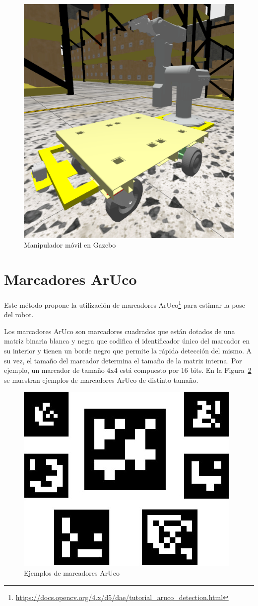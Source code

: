 \documentclass[12pt, a4paper]{report}
\begin{document}
			\begin{figure}[H]
				\centering
				\includegraphics[width=0.7\linewidth]{img/CARROLAC}
				\caption[Carrolac]{Manipulador móvil en Gazebo}
				\label{fig:carrolac}
			\end{figure}

		\section{Marcadores ArUco}\label{sec:marcadores-aruco}
			Este método propone la utilización de marcadores ArUco\footnote{\url{https://docs.opencv.org/4.x/d5/dae/tutorial\_aruco\_detection.html}} para estimar la pose del robot.

			Los marcadores ArUco son marcadores cuadrados que están dotados de una matriz binaria blanca y negra que codifica el identificador único del marcador en su interior y tienen un borde negro que permite la rápida detección del mismo.
			A su vez, el tamaño del marcador determina el tamaño de la matriz interna.
			Por ejemplo, un marcador de tamaño 4x4 está compuesto por 16 bits.
			En la Figura~\ref{fig:markers} se muestran ejemplos de marcadores ArUco de distinto tamaño.

			\begin{figure}[H]
				\centering
				\includegraphics[width=0.7\linewidth]{img/markers}
				\caption[Carrolac]{Ejemplos de marcadores ArUco}
				\label{fig:markers}
			\end{figure}
\end{document}
